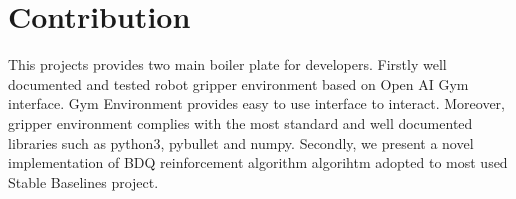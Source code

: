 \section{Contribution}

This projects provides two main boiler plate for developers. 
Firstly well documented and tested robot gripper environment based on Open AI Gym interface\cite{openai gym}. 
Gym Environment provides easy to use interface to interact. Moreover, gripper environment complies with the
most standard and well documented libraries such as python3, pybullet and numpy. Secondly, we present a novel implementation of BDQ reinforcement algorithm algorihtm
adopted to most used Stable Baselines project\cite{stable-baselines}.
